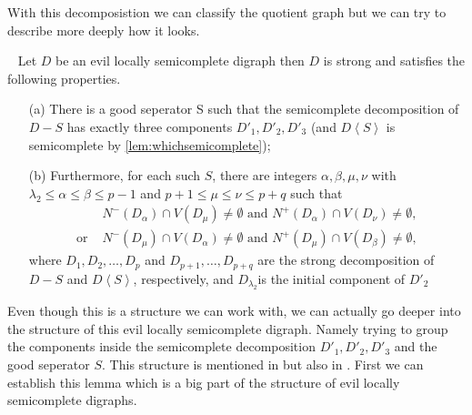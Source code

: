 With this decomposistion we can classify the quotient graph but we can try to describe more deeply how it looks.
\begin{thm}~\cite{bangJGT85,bangJCT102}
    Let $D$ be an evil locally semicomplete digraph then $D$ is strong and satisfies the following properties.
    \begin{itemize}
        \item[(a)]There is a good seperator S such that the semicomplete decomposition of $D-S$ has exactly three components $D'_1,D'_2,D'_3$ (and $D\left<S\right>$ is semicomplete by \autoref{lem:whichsemicomplete});
        \item[(b)] Furthermore, for each such $S$, there are integers $\alpha, \beta,\mu,\nu$ with $\lambda_2\leq \alpha \leq \beta \leq p-1$ and $p+1\leq \mu \leq \nu \leq p+q$ such that 
        \begin{align}
            &N^-(D_\alpha)\cap V(D_\mu)\neq \emptyset \text{ and } N^+(D_\alpha)\cap V(D_\nu)\neq \emptyset,\\
            \text{or } &N^-(D_\mu)\cap V(D_\alpha)\neq \emptyset \text{ and } N^+(D_\mu)\cap V(D_\beta)\neq \emptyset,
        \end{align} 
        where $D_1,D_2,\dots, D_p$ and $D_{p+1},\dots,D_{p+q}$ are the strong decomposition of $D-S$ and $D\left< S\right>$, respectively, and $D_{\lambda_2}$is the initial component of $D'_2$ 
    \end{itemize}
    \label{thm:evildecom}
\end{thm}
Even though this is a structure we can work with, we can actually go deeper into the structure of this evil locally semicomplete digraph. 
Namely trying to group the components inside the semicomplete decomposition $D'_1,D'_2,D'_3$ and the good seperator $S$. 
This structure is mentioned in \cite{bangJGT85} but also in \cite{tildeDMCS}. First we can establish this lemma which is a big part of the structure of evil locally semicomplete digraphs.
